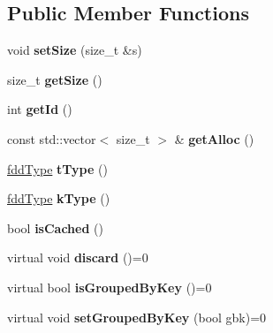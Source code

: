 \subsection*{Public Member Functions}
\begin{DoxyCompactItemize}
\item 
\hypertarget{classfaster_1_1fddBase_a41699519e9774d380bd0053f3d3b995a}{}\label{classfaster_1_1fddBase_a41699519e9774d380bd0053f3d3b995a} 
void {\bfseries set\+Size} (size\+\_\+t \&s)
\item 
\hypertarget{classfaster_1_1fddBase_ab9645c31245a53f97449446a440adf47}{}\label{classfaster_1_1fddBase_ab9645c31245a53f97449446a440adf47} 
size\+\_\+t {\bfseries get\+Size} ()
\item 
\hypertarget{classfaster_1_1fddBase_a3902296c393cb15e830c02555a0f371f}{}\label{classfaster_1_1fddBase_a3902296c393cb15e830c02555a0f371f} 
int {\bfseries get\+Id} ()
\item 
\hypertarget{classfaster_1_1fddBase_a2b6f4b4fa670e90cde938d456e5da3b7}{}\label{classfaster_1_1fddBase_a2b6f4b4fa670e90cde938d456e5da3b7} 
const std\+::vector$<$ size\+\_\+t $>$ \& {\bfseries get\+Alloc} ()
\item 
\hypertarget{classfaster_1_1fddBase_a640157513b4752863e877391de92ede4}{}\label{classfaster_1_1fddBase_a640157513b4752863e877391de92ede4} 
\hyperlink{namespacefaster_aa8898687bc64536b60a3d5f365060cd6}{fdd\+Type} {\bfseries t\+Type} ()
\item 
\hypertarget{classfaster_1_1fddBase_a18c8bafa38afa84895db3c27c0416187}{}\label{classfaster_1_1fddBase_a18c8bafa38afa84895db3c27c0416187} 
\hyperlink{namespacefaster_aa8898687bc64536b60a3d5f365060cd6}{fdd\+Type} {\bfseries k\+Type} ()
\item 
\hypertarget{classfaster_1_1fddBase_ae2b4fdf3a1e7ac336b21f5e197dfb4a7}{}\label{classfaster_1_1fddBase_ae2b4fdf3a1e7ac336b21f5e197dfb4a7} 
bool {\bfseries is\+Cached} ()
\item 
\hypertarget{classfaster_1_1fddBase_a4cbed7c20357b0732414af58a9d60380}{}\label{classfaster_1_1fddBase_a4cbed7c20357b0732414af58a9d60380} 
virtual void {\bfseries discard} ()=0
\item 
\hypertarget{classfaster_1_1fddBase_a14ec9acc33546362f86ac34b369956fa}{}\label{classfaster_1_1fddBase_a14ec9acc33546362f86ac34b369956fa} 
virtual bool {\bfseries is\+Grouped\+By\+Key} ()=0
\item 
\hypertarget{classfaster_1_1fddBase_a0758eda48ad1cee20071ba8ce1852037}{}\label{classfaster_1_1fddBase_a0758eda48ad1cee20071ba8ce1852037} 
virtual void {\bfseries set\+Grouped\+By\+Key} (bool gbk)=0
\end{DoxyCompactItemize}
